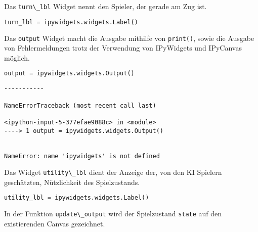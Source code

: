 Das \passthrough{\lstinline!turn\_lbl!} Widget nennt den Spieler, der
gerade am Zug ist.

\begin{lstlisting}[language=Python]
turn_lbl = ipywidgets.widgets.Label()
\end{lstlisting}

Das \passthrough{\lstinline!output!} Widget macht die Ausgabe mithilfe
von \passthrough{\lstinline!print()!}, sowie die Ausgabe von
Fehlermeldungen trotz der Verwendung von IPyWidgets und IPyCanvas
möglich.

\begin{lstlisting}[language=Python]
output = ipywidgets.widgets.Output()
\end{lstlisting}

\begin{lstlisting}
-----------

NameErrorTraceback (most recent call last)

<ipython-input-5-377efae9088c> in <module>
----> 1 output = ipywidgets.widgets.Output()


NameError: name 'ipywidgets' is not defined
\end{lstlisting}

Das Widget \passthrough{\lstinline!utility\_lbl!} dient der Anzeige der,
von den KI Spielern geschätzten, Nützlichkeit des Spielzustands.

\begin{lstlisting}[language=Python]
utility_lbl = ipywidgets.widgets.Label()
\end{lstlisting}

In der Funktion \passthrough{\lstinline!update\_output!} wird der
Spielzustand \passthrough{\lstinline!state!} auf den existierenden
Canvas gezeichnet.

